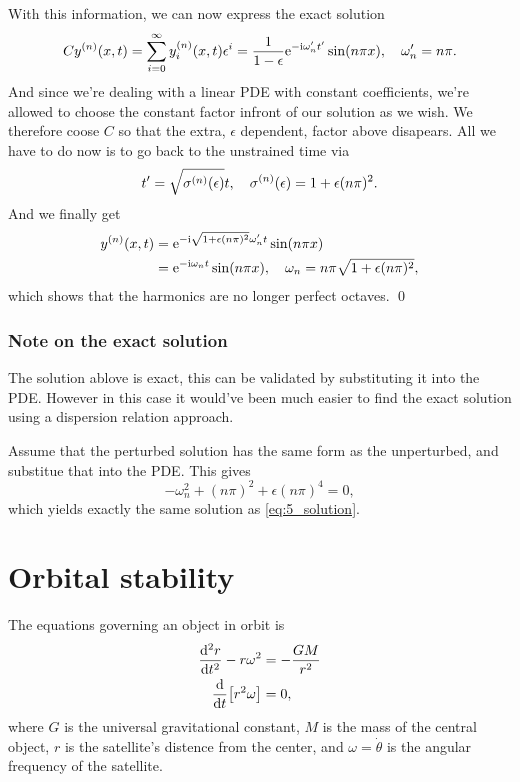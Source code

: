 \documentclass[11pt,letter, swedish, english
]{article}
\begin{document}
With this information, we can now express the exact solution
\begin{equation}
C\yn(x, t) = \sum_{i=0}^\infty\yn_i(x, t)\epsilon^i
=\frac{1}{1-\epsilon}\ee^{-\ii\omega_n't'}\sin(n\pi x) \qcomma \omega_n'=n\pi.
\end{equation}
And since we're dealing with a linear PDE with constant coefficients,
we're allowed to choose the constant factor infront of our solution as
we wish. We therefore coose $C$ so that the extra, $\epsilon$
dependent, factor above disapears. All we have to do now is to go back
to the unstrained time via 
\begin{equation}
t'=\sqrt{\sn(\epsilon)}t \qcomma \sn(\epsilon) = 1 + \epsilon(n\pi)^2.
\end{equation}
And we finally get
\begin{equation}\label{eq:5_solution}
\begin{aligned}
\yn(x, t) &= \ee^{-\ii\sqrt{1+\epsilon(n\pi)^2}\omega_n't}\sin(n\pi x) \\
&= \ee^{-\ii\omega_nt}\sin(n\pi x) 
\qcomma \omega_n=n\pi\sqrt{1+\epsilon(n\pi)^2},
\end{aligned}
\end{equation}
which shows that the harmonics are no longer perfect octaves.
\qed

\subsubsection*{Note on the exact solution}
The solution ablove is exact, this can be validated by substituting it
into the PDE. However in this case it would've been much easier to
find the exact solution using a dispersion relation approach. 

Assume that the perturbed solution has the same form\footnotemark{} as
the unperturbed, and substitue that into the PDE. This gives
\begin{equation}
-\omega_n^2 + (n\pi)^2 + \epsilon(n\pi)^4=0,
\end{equation}
which yields exactly the same solution as \eqref{eq:5_solution}.

\section{Orbital stability }
The equations governing an object in orbit is
\begin{align}
\label{eq:6_force_balance}
\dv[2]{r}{t} - r\omega^2 &= -\frac{GM}{r^2}
\\ \label{eq:6_ang_momentum}
\dv{t}\qty[r^2\omega] &= 0,
\end{align}
where $G$ is the universal gravitational constant, $M$ is the mass of
the central object, $r$ is the satellite's distence from the center,
and $\omega=\dot\theta$ is the angular frequency of the satellite. 
\end{document}
